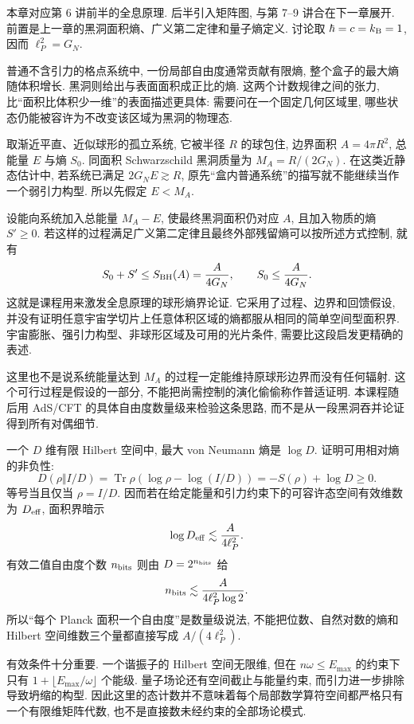 本章对应第 6 讲前半的全息原理. 后半引入矩阵图, 与第 7--9 讲合在下一章展开. 前置是上一章的黑洞面积熵、广义第二定律和量子熵定义. 讨论取 $\hbar=c=k_{\mathrm B}=1$, 因而 $\ell_P^2=G_N$.

普通不含引力的格点系统中, 一份局部自由度通常贡献有限熵, 整个盒子的最大熵随体积增长. 黑洞则给出与表面面积成正比的熵. 这两个计数规律之间的张力, 比“面积比体积少一维”的表面描述更具体: 需要问在一个固定几何区域里, 哪些状态仍能被容许为不改变该区域为黑洞的物理态.

取渐近平直、近似球形的孤立系统, 它被半径 $R$ 的球包住, 边界面积 $A=4\pi R^2$, 总能量 $E$ 与熵 $S_0$. 同面积 Schwarzschild 黑洞质量为 $M_A=R/(2G_N)$. 在这类近静态估计中, 若系统已满足 $2G_NE\gtrsim R$, 原先“盒内普通系统”的描写就不能继续当作一个弱引力构型. 所以先假定 $E<M_A$.

设能向系统加入总能量 $M_A-E$, 使最终黑洞面积仍对应 $A$, 且加入物质的熵 $S'\ge0$. 若这样的过程满足广义第二定律且最终外部残留熵可以按所述方式控制, 就有
\[
S_0+S'\le S_{\rm BH}(A)=\frac{A}{4G_N},
\qquad S_0\le\frac{A}{4G_N}.
\]
这就是课程用来激发全息原理的球形熵界论证. 它采用了过程、边界和回馈假设, 并没有证明任意宇宙学切片上任意体积区域的熵都服从相同的简单空间型面积界. 宇宙膨胀、强引力构型、非球形区域及可用的光片条件, 需要比这段启发更精确的表述.

这里也不是说系统能量达到 $M_A$ 的过程一定能维持原球形边界而没有任何辐射. 这个可行过程是假设的一部分, 不能把尚需控制的演化偷偷称作普适证明. 本课程随后用 AdS/CFT 的具体自由度数量级来检验这条思路, 而不是从一段黑洞吞并论证得到所有对偶细节.

一个 $D$ 维有限 Hilbert 空间中, 最大 von Neumann 熵是 $\log D$. 证明可用相对熵的非负性:
\[
D(\rho\Vert I/D)=\operatorname{Tr}\rho(\log\rho-\log(I/D))
=-S(\rho)+\log D\ge0.
\]
等号当且仅当 $\rho=I/D$. 因而若在给定能量和引力约束下的可容许态空间有效维数为 $D_{\rm eff}$, 面积界暗示
\[
\log D_{\rm eff}\lesssim\frac A{4\ell_P^2}.
\]
有效二值自由度个数 $n_{\rm bits}$ 则由 $D=2^{n_{\rm bits}}$ 给
\[
n_{\rm bits}\lesssim\frac A{4\ell_P^2\log2}.
\]
所以“每个 Planck 面积一个自由度”是数量级说法, 不能把位数、自然对数的熵和 Hilbert 空间维数三个量都直接写成 $A/(4\ell_P^2)$.

有效条件十分重要. 一个谐振子的 Hilbert 空间无限维, 但在 $n\omega\le E_{\max}$ 的约束下只有 $1+\lfloor E_{\max}/\omega\rfloor$ 个能级. 量子场论还有空间截止与能量约束, 而引力进一步排除导致坍缩的构型. 因此这里的态计数并不意味着每个局部数学算符空间都严格只有一个有限维矩阵代数, 也不是直接数未经约束的全部场论模式.

